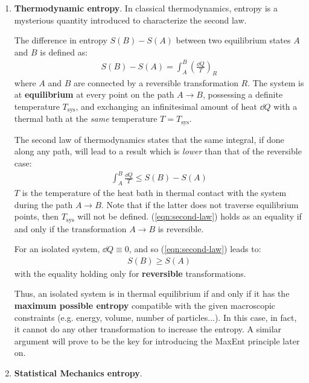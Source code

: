 \documentclass[../template.tex]{subfiles}
\begin{document}
\begin{enumerate}
    \item \textbf{Thermodynamic entropy}. In classical thermodynamics, entropy is a mysterious quantity introduced to characterize the second law.
    

    The difference in entropy $S(B) - S(A)$ between two equilibrium states $A$ and $B$ is defined as:
    \begin{align}\label{eqn:entropy-CT}
        S(B) - S(A) = \int_A^B \left(\frac{\dd{Q}}{T} \right)_R
    \end{align}
    where $A$ and $B$ are connected by a reversible transformation $R$. The system is at \textbf{equilibrium} at every point on the path $A \to B$, possessing a definite temperature $T_{\mathrm{sys}}$, and exchanging an infinitesimal amount of heat $\dd{Q}$ with a thermal bath at the \textit{same} temperature $T=T_{\mathrm{sys}}$.  

    The second law of thermodynamics states that the same integral, if done along any path, will lead to a result which is \textit{lower} than that of the reversible case:   
    \begin{align}\label{eqn:second-law}
        \int_A^B \frac{\dd{Q}}{T} \leq S(B) - S(A) 
    \end{align}
    $T$ is the temperature of the heat bath in thermal contact with the system during the path $A \to B$. Note that if the latter does not traverse equilibrium points, then $T_{\mathrm{sys}}$ will not be defined. 
    (\ref{eqn:second-law}) holds as an equality if and only if the transformation $A \to B$ is reversible.

    \medskip

    For an isolated system, $\dd{Q} \equiv 0$, and so (\ref{eqn:second-law}) leads to:
    \begin{align*}
        S(B) \geq S(A)
    \end{align*}
    with the equality holding only for \textbf{reversible} transformations.
    
    Thus, an isolated system is in thermal equilibrium if and only if it has the \textbf{maximum possible entropy} compatible with the given macroscopic constraints (e.g. energy, volume, number of particles...). In this case, in fact, it cannot do any other transformation to increase the entropy. A similar argument will prove to be the key for introducing the MaxEnt principle later on.

    \item \textbf{Statistical Mechanics entropy}. 
    

\end{enumerate}
\end{document}
